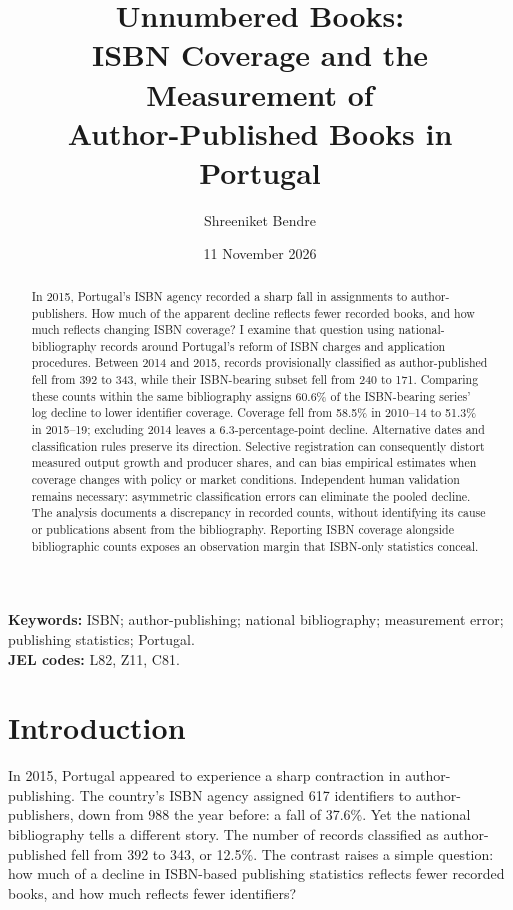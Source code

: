 \documentclass[11pt]{article}
\title{Unnumbered Books:\\ISBN Coverage and the Measurement of\\Author-Published Books in Portugal}
\author{Shreeniket Bendre}
\date{11 November 2026}
\begin{document}
\maketitle
\begin{abstract}
\indent In 2015, Portugal's ISBN agency recorded a sharp fall in assignments to author-publishers. How much of the apparent decline reflects fewer recorded books, and how much reflects changing ISBN coverage? I examine that question using national-bibliography records around Portugal's reform of ISBN charges and application procedures. Between 2014 and 2015, records provisionally classified as author-published fell from 392 to 343, while their ISBN-bearing subset fell from 240 to 171. Comparing these counts within the same bibliography assigns 60.6\% of the ISBN-bearing series' log decline to lower identifier coverage. Coverage fell from 58.5\% in 2010--14 to 51.3\% in 2015--19; excluding 2014 leaves a 6.3-percentage-point decline. Alternative dates and classification rules preserve its direction. Selective registration can consequently distort measured output growth and producer shares, and can bias empirical estimates when coverage changes with policy or market conditions. Independent human validation remains necessary: asymmetric classification errors can eliminate the pooled decline. The analysis documents a discrepancy in recorded counts, without identifying its cause or publications absent from the bibliography. Reporting ISBN coverage alongside bibliographic counts exposes an observation margin that ISBN-only statistics conceal.
\end{abstract}
\noindent\textbf{Keywords:} ISBN; author-publishing; national bibliography; measurement error; publishing statistics; Portugal.\\
\textbf{JEL codes:} L82, Z11, C81.

\section{Introduction}

In 2015, Portugal appeared to experience a sharp contraction in author-publishing. The country's ISBN agency assigned 617 identifiers to author-publishers, down from 988 the year before: a fall of 37.6\%. Yet the national bibliography tells a different story. The number of records classified as author-published fell from 392 to 343, or 12.5\%. The contrast raises a simple question: how much of a decline in ISBN-based publishing statistics reflects fewer recorded books, and how much reflects fewer identifiers?
\end{document}
